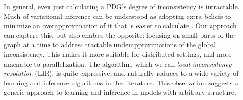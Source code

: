 In general, even just calculating a PDG's degree of inconsistency is intractable.
Much of variational inference can be understood as
    adopting extra beliefs to
    minimize an over\-approximation of it that is easier to calculate \cite{one-true-loss}.
Our approach can capture this, but also enables the opposite:
    focusing on small parts of the graph at a time to
    address tractable under\-approximations of the global inconsistency.
This makes it more suitable for distributed settings,
    and more amenable to parallelization.
%
The algorithm, which we call \emph{local inconsistency resolution} (LIR),
    is quite expressive,
    and naturally reduces to a wide variety of learning and inference algorithms in the literature.
This observation suggests a generic approach to learning and
    inference in models with arbitrary structure.
%



